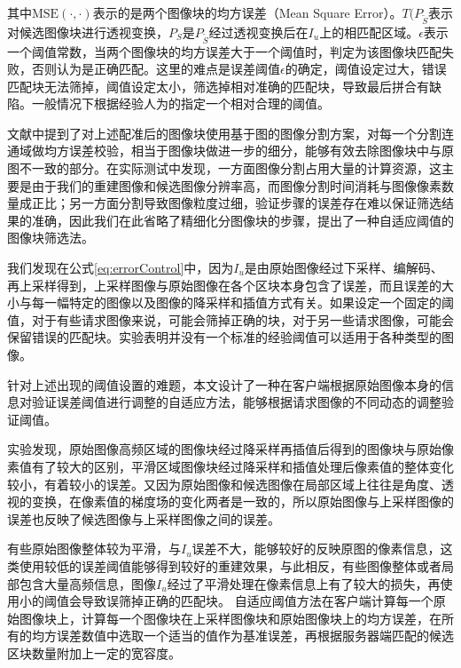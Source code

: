 \documentclass[UTF8]{csoarticle}
\begin{document}
其中\(\text{MSE}(\cdot,\cdot)\)表示的是两个图像块的均方误差（Mean Square Error）。\(T(P_{\tilde{S}}\)表示对候选图像块进行透视变换，\(P_{S}\)是\(P_{\tilde{S}}\)经过透视变换后在\(I_u\)上的相匹配区域。\(\epsilon\)表示一个阈值常数，当两个图像块的均方误差大于一个阈值时，判定为该图像块匹配失败，否则认为是正确匹配。这里的难点是误差阈值\(\epsilon\)的确定，阈值设定过大，错误匹配块无法筛掉，阈值设定太小，筛选掉相对准确的匹配块，导致最后拼合有缺陷。一般情况下根据经验人为的指定一个相对合理的阈值。

文献\cite{Dai:2012vn}中提到了对上述配准后的图像块使用基于图的图像分割方案，对每一个分割连通域做均方误差校验，相当于图像块做进一步的细分，能够有效去除图像块中与原图不一致的部分。在实际测试中发现，一方面图像分割占用大量的计算资源，这主要是由于我们的重建图像和候选图像分辨率高，而图像分割时间消耗与图像像素数量成正比；另一方面分割导致图像粒度过细，验证步骤的误差存在难以保证筛选结果的准确，因此我们在此省略了精细化分图像块的步骤，提出了一种自适应阈值的图像块筛选法。

我们发现在公式\ref{eq:errorControl}中，因为\(I_u\)是由原始图像经过下采样、编解码、再上采样得到，上采样图像与原始图像在各个区块本身包含了误差，而且误差的大小与每一幅特定的图像以及图像的降采样和插值方式有关。如果设定一个固定的阈值，对于有些请求图像来说，可能会筛掉正确的块，对于另一些请求图像，可能会保留错误的匹配块。实验表明并没有一个标准的经验阈值可以适用于各种类型的图像。

针对上述出现的阈值设置的难题，本文设计了一种在客户端根据原始图像本身的信息对验证误差阈值进行调整的自适应方法，能够根据请求图像的不同动态的调整验证阈值。

实验发现，原始图像高频区域的图像块经过降采样再插值后得到的图像块与原始像素值有了较大的区别，平滑区域图像块经过降采样和插值处理后像素值的整体变化较小，有着较小的误差。又因为原始图像和候选图像在局部区域上往往是角度、透视的变换，在像素值的梯度场的变化两者是一致的，所以原始图像与上采样图像的误差也反映了候选图像与上采样图像之间的误差。

有些原始图像整体较为平滑，与\(I_u\)误差不大，能够较好的反映原图的像素信息，这类使用较低的误差阈值能够得到较好的重建效果，与此相反，有些图像整体或者局部包含大量高频信息，图像\(I_u\)经过了平滑处理在像素信息上有了较大的损失，再使用小的阈值会导致误筛掉正确的匹配块。
自适应阈值方法在客户端计算每一个原始图像块上，计算每一个图像块在上采样图像块和原始图像块上的均方误差，在所有的均方误差数值中选取一个适当的值作为基准误差，再根据服务器端匹配的候选区块数量附加上一定的宽容度。
\end{document}

